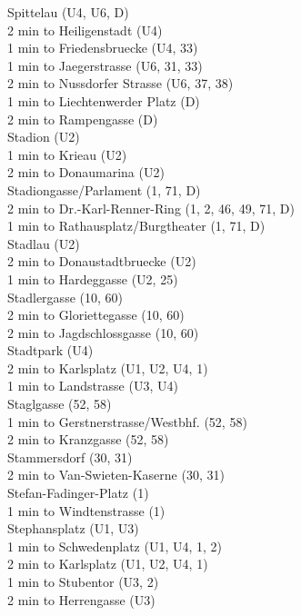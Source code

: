 \documentclass[12pt]{article}
\newcommand\tab[1][1cm]{\hspace*{#1}}
\begin{document}
\noindent Spittelau (U4, U6, D)\\
    \tab2 min to Heiligenstadt (U4)\\
    \tab1 min to Friedensbruecke (U4, 33)\\
    \tab1 min to Jaegerstrasse (U6, 31, 33)\\
    \tab2 min to Nussdorfer Strasse (U6, 37, 38)\\
    \tab1 min to Liechtenwerder Platz (D)\\
    \tab2 min to Rampengasse (D)\\
Stadion (U2)\\
    \tab1 min to Krieau (U2)\\
    \tab2 min to Donaumarina (U2)\\
Stadiongasse/Parlament (1, 71, D)\\
    \tab2 min to Dr.-Karl-Renner-Ring (1, 2, 46, 49, 71, D)\\
    \tab1 min to Rathausplatz/Burgtheater (1, 71, D)\\
Stadlau (U2)\\
    \tab2 min to Donaustadtbruecke (U2)\\
    \tab1 min to Hardeggasse (U2, 25)\\
Stadlergasse (10, 60)\\
    \tab2 min to Gloriettegasse (10, 60)\\
    \tab2 min to Jagdschlossgasse (10, 60)\\
Stadtpark (U4)\\
    \tab2 min to Karlsplatz (U1, U2, U4, 1)\\
    \tab1 min to Landstrasse (U3, U4)\\
Staglgasse (52, 58)\\
    \tab1 min to Gerstnerstrasse/Westbhf. (52, 58)\\
    \tab2 min to Kranzgasse (52, 58)\\
Stammersdorf (30, 31)\\
    \tab2 min to Van-Swieten-Kaserne (30, 31)\\
Stefan-Fadinger-Platz (1)\\
    \tab1 min to Windtenstrasse (1)\\
Stephansplatz (U1, U3)\\
    \tab1 min to Schwedenplatz (U1, U4, 1, 2)\\
    \tab2 min to Karlsplatz (U1, U2, U4, 1)\\
    \tab1 min to Stubentor (U3, 2)\\
    \tab2 min to Herrengasse (U3)\\
\end{document}
